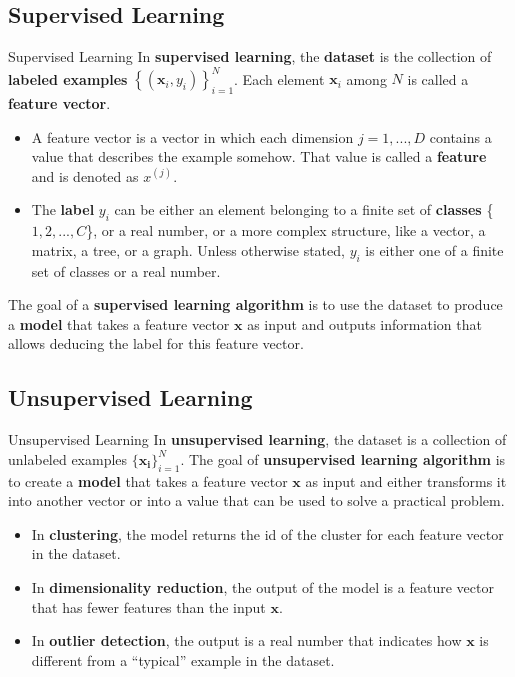 \documentclass[10pt,dvipsnames]{beamer}
\begin{document}
\subsection{Supervised Learning}
\begin{frame}{Supervised Learning}
    In \textbf{supervised learning}, the \textbf{dataset} is the collection of \textbf{labeled examples} \(\left\{\left(\mathbf{x}_{i}, y_{i}\right)\right\}_{i=1}^{N}\). Each element \(\mathbf{x}_{i}\) among \(N\) is called a \textbf{feature vector}.
    \begin{itemize}
        \item A feature vector is a vector in which each dimension \(j=1,...,D\) contains a value that describes the example somehow. That value is called a \textbf{feature} and is denoted as \(x^{(j)}\).
        \item The \textbf{label} \(y_i\) can be either an element belonging to a finite set of \textbf{classes} \{\(1,2,...,C\)\}, or a real number, or a more complex structure, like a vector, a matrix, a tree, or a graph. Unless otherwise stated, \(y_i\) is either one of a finite set of classes or a real number.
    \end{itemize}
    The goal of a \textbf{supervised learning algorithm} is to use the dataset to produce a \textbf{model} that takes a feature vector \(\mathbf{x}\) as input and outputs information that allows deducing the label for this feature vector.
\end{frame}

\subsection{Unsupervised Learning}
\begin{frame}{Unsupervised Learning}
    In \textbf{unsupervised learning}, the dataset is a collection of unlabeled examples \(\{\mathbf{x_i}\}^{N}_{i=1}\). The goal of \textbf{unsupervised learning algorithm} is to create a \textbf{model} that takes a feature vector \(\mathbf{x}\) as input and either transforms it into another vector or into a value that can be used to solve a practical problem.
    \begin{itemize}
        \item In \textbf{clustering}, the model returns the id of the cluster for each feature vector in the dataset.
        \item In \textbf{dimensionality reduction}, the output of the model is a feature vector that has fewer features than the input \(\mathbf{x}\).
        \item In \textbf{outlier detection}, the output is a real number that indicates how \(\mathbf{x}\) is different from a ``typical'' example in the dataset.
    \end{itemize}
\end{frame}
\end{document}
